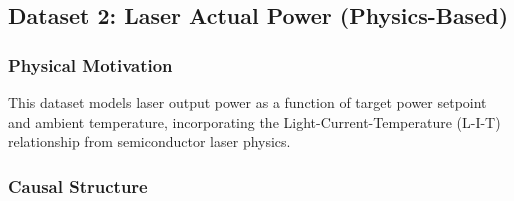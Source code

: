 \documentclass[11pt,a4paper]{article}
\begin{document}
\subsection{Dataset 2: Laser Actual Power (Physics-Based)}

\subsubsection{Physical Motivation}

This dataset models laser output power as a function of target power setpoint and ambient temperature, incorporating the Light-Current-Temperature (L-I-T) relationship from semiconductor laser physics.

\subsubsection{Causal Structure}
\end{document}
